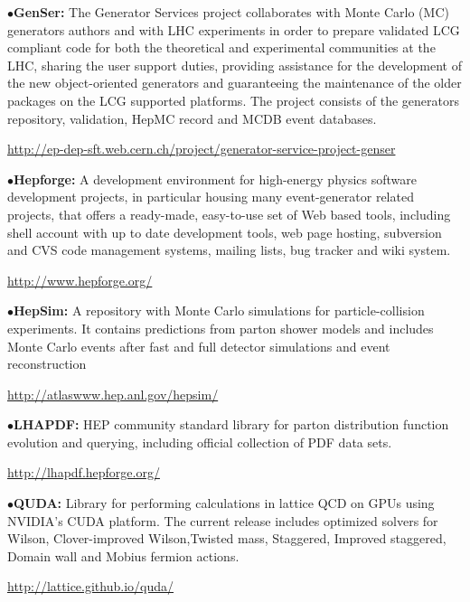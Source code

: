 \medskip

\item{$\bullet$}{\bf GenSer:} The Generator Services project collaborates with Monte Carlo (MC) 
generators authors and with LHC experiments in order to prepare validated LCG compliant code for 
both the theoretical and experimental communities at the LHC, sharing the user support duties, 
providing assistance for the development of the new object-oriented generators and guaranteeing 
the maintenance of the older packages on the LCG supported platforms. The project consists of the 
generators repository, validation, HepMC record and MCDB event databases.
	\item{}\quad\url{http://ep-dep-sft.web.cern.ch/project/generator-service-project-genser}

\medskip

\item{$\bullet$}{\bf Hepforge:}
A development environment for high-energy physics software development projects, 
in particular housing many event-generator related projects, that offers a ready-made, 
easy-to-use set of Web based tools, including shell account with up to date development 
tools, web page hosting, subversion and CVS code management systems, mailing lists, bug tracker and wiki system.
	\item{}\qquad\url{http://www.hepforge.org/}

\medskip

\item{$\bullet$}{\bf HepSim:}
A repository with Monte Carlo simulations for particle-collision experiments. It contains predictions from parton shower models and includes Monte Carlo events after fast and full detector simulations and event reconstruction
	\item{}\qquad\url{http://atlaswww.hep.anl.gov/hepsim/}

\medskip

\item{$\bullet$}{\bf LHAPDF:}
HEP community standard library for parton distribution function evolution and querying, including official collection of PDF data sets.
	\item{}\qquad\url{http://lhapdf.hepforge.org/}

\medskip

\item{$\bullet$}{\bf QUDA:} 
Library for performing calculations in lattice QCD on GPUs using NVIDIA's CUDA platform. The current release includes optimized solvers for Wilson, Clover-improved Wilson,Twisted mass, Staggered, Improved staggered, Domain wall and Mobius fermion actions.
	\item{}\qquad\url{http://lattice.github.io/quda/}

